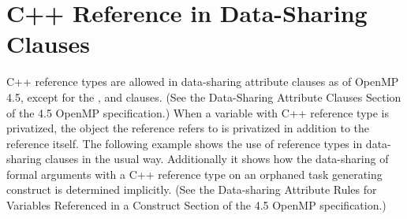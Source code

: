 \section{C++ Reference in Data-Sharing Clauses}
\cppspecificstart
\label{sec:cpp_reference}

C++ reference types are allowed in data-sharing attribute clauses as of OpenMP 4.5, except
for the ,  and  clauses.  
(See the Data-Sharing Attribute Clauses Section of the 4.5 OpenMP specification.)
When a variable with C++ reference type is privatized, the object the reference refers to is privatized in addition to the reference itself.
The following example shows the use of reference types in data-sharing clauses in the usual way.
Additionally it shows how the data-sharing of formal arguments with a C++ reference type on an orphaned task generating construct is determined implicitly. (See the Data-sharing Attribute Rules for Variables Referenced in a Construct Section of the 4.5 OpenMP specification.)


\cppspecificend

